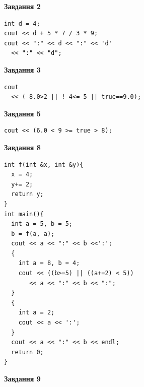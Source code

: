 \documentclass[12pt, ukrainian]{article}
\begin{document}
{\begin {large}
\begin{minipage}[t]{7.0cm}
\end{minipage}
\vline \hspace{1mm}
\begin{minipage}[t]{11.0cm}

\begin{center}
\textbf{Завдання 2}
\end{center}
\vspace{-8mm}

\begin{verbatim}
int d = 4;
cout << d + 5 * 7 / 3 * 9;
cout << ":" << d << ":" << 'd' 
  << ":" << "d";
\end{verbatim}



\begin{center}
\textbf{Завдання 3}
\end{center}
\vspace{-8mm}

\begin{verbatim}
cout 
  << ( 8.0>2 || ! 4<= 5 || true==9.0);
\end{verbatim}



\begin{center}
\textbf{Завдання 5}
\end{center}
\vspace{-8mm}

\begin{verbatim}
cout << (6.0 < 9 >= true > 8);
\end{verbatim}



\begin{center}
\textbf{Завдання 8}
\end{center}
\vspace{-8mm}

\begin{verbatim}
int f(int &x, int &y){
  x = 4;
  y+= 2;
  return y;
}
int main(){
  int a = 5, b = 5;
  b = f(a, a);
  cout << a << ":" << b <<':';
  {
    int a = 8, b = 4;
    cout << ((b>=5) || ((a+=2) < 5))
       << a << ":" << b << ":";
  }
  {
    int a = 2;
    cout << a << ':';
  }
  cout << a << ":" << b << endl;
  return 0;
}
\end{verbatim}

\end{minipage}


\begin{minipage}[t]{7.0cm}

\begin{center}
\textbf{Завдання 9}
\end{center}
\vspace{-8mm}


\end{minipage}
\end{large}}
\end{document}
